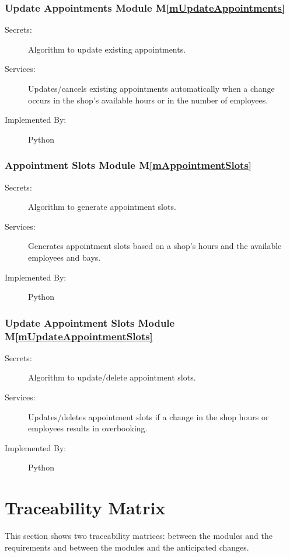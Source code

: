 \documentclass[12pt, titlepage]{article}
\newcommand{\mref}[1]{M\ref{#1}}
\begin{document}
\subsubsection{Update Appointments Module \mref{mUpdateAppointments}}
\begin{description}
\item[Secrets:]Algorithm to update existing appointments.
\item[Services:]Updates/cancels existing appointments automatically when a change occurs in the shop's available hours or in the number of employees.
\item[Implemented By:] Python
\end{description}

\subsubsection{Appointment Slots Module \mref{mAppointmentSlots}}
\begin{description}
\item[Secrets:]Algorithm to generate appointment slots.
\item[Services:]Generates appointment slots based on a shop's hours and the available employees and bays.
\item[Implemented By:] Python
\end{description}

\subsubsection{Update Appointment Slots Module \mref{mUpdateAppointmentSlots}}
\begin{description}
\item[Secrets:]Algorithm to update/delete appointment slots.
\item[Services:]Updates/deletes appointment slots if a change in the shop hours or employees results in overbooking.
\item[Implemented By:] Python
\end{description}

\section{Traceability Matrix} \label{SecTM}

This section shows two traceability matrices: between the modules and the
requirements and between the modules and the anticipated changes.
\end{document}
